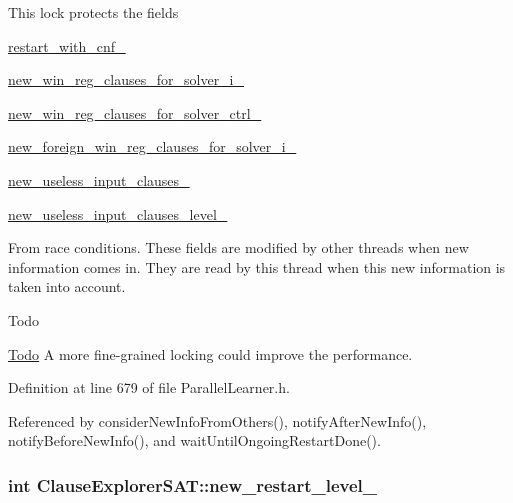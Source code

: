 This lock protects the fields 
\begin{DoxyItemize}
\item \hyperlink{classClauseExplorerSAT_a1a9dc7f76967c8164e9625df34dec172}{restart\-\_\-with\-\_\-cnf\-\_\-} 
\item \hyperlink{classClauseExplorerSAT_a2c3e73b4c0529b9139354a965d34e81f}{new\-\_\-win\-\_\-reg\-\_\-clauses\-\_\-for\-\_\-solver\-\_\-i\-\_\-} 
\item \hyperlink{classClauseExplorerSAT_a7d923928f3cb6209b29f5cc5104b5fe2}{new\-\_\-win\-\_\-reg\-\_\-clauses\-\_\-for\-\_\-solver\-\_\-ctrl\-\_\-} 
\item \hyperlink{classClauseExplorerSAT_a70c8edd590d75994ee354d591909cd35}{new\-\_\-foreign\-\_\-win\-\_\-reg\-\_\-clauses\-\_\-for\-\_\-solver\-\_\-i\-\_\-} 
\item \hyperlink{classClauseExplorerSAT_a3d1bdb9a6484c85af655a4eed1ee5f19}{new\-\_\-useless\-\_\-input\-\_\-clauses\-\_\-} 
\item \hyperlink{classClauseExplorerSAT_a67eeafbba9da9c87534f7ef26531a57a}{new\-\_\-useless\-\_\-input\-\_\-clauses\-\_\-level\-\_\-} 
\end{DoxyItemize}From race conditions. These fields are modified by other threads when new information comes in. They are read by this thread when this new information is taken into account.

\begin{DoxyRefDesc}{Todo}
\item[\hyperlink{todo__todo000008}{Todo}]A more fine-\/grained locking could improve the performance. \end{DoxyRefDesc}


Definition at line 679 of file Parallel\-Learner.\-h.



Referenced by consider\-New\-Info\-From\-Others(), notify\-After\-New\-Info(), notify\-Before\-New\-Info(), and wait\-Until\-Ongoing\-Restart\-Done().

\hypertarget{classClauseExplorerSAT_adf9bfe4390d34e57e25f269afa1e7b25}{
\subsubsection[{new\-\_\-restart\-\_\-level\-\_\-}]{\setlength{\rightskip}{0pt plus 5cm}int Clause\-Explorer\-S\-A\-T\-::new\-\_\-restart\-\_\-level\-\_\-\hspace{0.3cm}{\ttfamily [protected]}}}\label{classClauseExplorerSAT_adf9bfe4390d34e57e25f269afa1e7b25}


